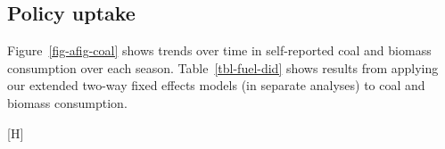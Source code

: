 \documentclass[
  letterpaper,
  DIV=11,
  numbers=noendperiod]{scrartcl}
\makeatletter
\renewenvironment{figure}%
   {\renewcommand\familydefault\sfdefault
    \@float{figure}}
   {\end@float}
\makeatother
\begin{document}
\newpage

\newpage

\subsection{Policy uptake}\label{policy-uptake-1}

Figure~\ref{fig-afig-coal} shows trends over time in self-reported coal
and biomass consumption over each season. Table~\ref{tbl-fuel-did} shows
results from applying our extended two-way fixed effects models (in
separate analyses) to coal and biomass consumption.

\begin{figure}[H]


\caption{\label{fig-afig-coal}Trends in self-reported coal and biomass,
by treatment season.}

\end{figure}%
\end{document}

